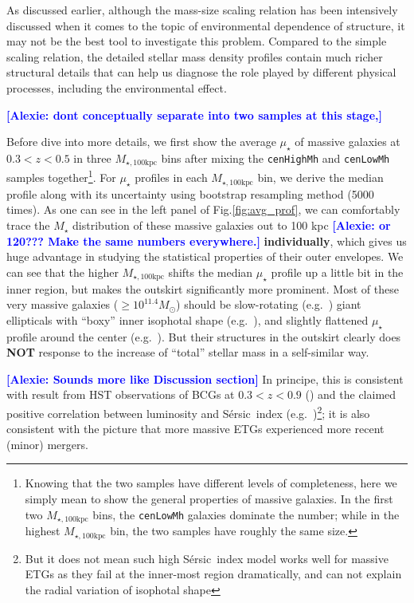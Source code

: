 \documentclass{emulateapj}
\def\ser{{S\'{e}rsic\ }}
\def\rbcg{\texttt{cenHighMh}}
\def\nbcg{\texttt{cenLowMh}}
\def\mstar{{$M_{\star}$}}
\def\mtot{{$M_{\star,100\mathrm{kpc}}$}}
\def\mden{{$\mu_{\star}$}}
\newcommand{\alexie}[1]{\textcolor{blue}{\textbf{[Alexie: #1]}}}
\newcommand{\update}[1]{\textcolor{Bittersweet}{#1}}
\begin{document}
\begin{CJK*}{UTF8}{gbsn}
    As discussed earlier, although the mass-size scaling relation has been intensively 
    discussed when it comes to the topic of environmental dependence of structure, 
    it may not be the best tool to investigate this problem.    
    Compared to the simple scaling relation, the detailed stellar mass density profiles 
    contain much richer structural details that can help us diagnose the role played by 
    different physical processes, including the environmental effect.  
    
    \alexie{dont conceptually separate into two samples at this stage,}
    
    \update{
    Before dive into more details, we first show the average \mden{} of massive galaxies 
    at $0.3 < z < 0.5$ in three \mtot{} bins after mixing the \rbcg{} and \nbcg{} 
    samples together\footnote{Knowing that the two samples have different levels of 
    completeness, here we simply mean to show the general properties of massive galaxies.
    In the first two \mtot{} bins, the \nbcg{} galaxies dominate the number; while in
    the highest \mtot{} bin, the two samples have roughly the same size.}.   
    For \mden{} profiles in each \mtot{} bin, we derive the median profile along with its 
    uncertainty using bootstrap resampling method (5000 times). 
    As one can see in the left panel of Fig.\ref{fig:avg_prof}, we can comfortably trace 
    the \mstar{} distribution of these massive galaxies out to 100 kpc \alexie{or 120??? Make the same numbers everywhere.}
    \textbf{individually}, which gives us huge advantage in studying the statistical 
    properties of their outer envelopes. 
    We can see that the higher \mtot{} shifts the median \mden{} profile up a little bit 
    in the inner region, but makes the outskirt significantly more prominent. 
    Most of these very massive galaxies ($\ge 10^{11.4} M_{\odot}$) should be 
    slow-rotating (e.g.\ \citealt{Cappellari13b}) giant ellipticals with ``boxy'' inner 
    isophotal shape (e.g.\ \citealt{Kormendy2009}), and slightly flattened \mden{} profile 
    around the center (e.g.\ \citealt{Lauer07}).
    But their structures in the outskirt clearly does \textbf{NOT} response to the 
    increase of ``total'' stellar mass in a self-similar way.}
        
    \alexie{Sounds more like Discussion section} In principe, this is consistent with result from HST observations of BCGs at 
    $0.3 < z <0.9$ (\citealt{Bai2014}) and the claimed positive correlation between 
    luminosity and \ser index (e.g.\ \citealt{Savorgnan13})\footnote{But it does not mean 
    such high \ser index model works well for massive ETGs as they fail at the inner-most 
    region dramatically, and can not explain the radial variation of isophotal shape}; 
    it is also consistent with the picture that more massive ETGs experienced more recent 
    (minor) mergers.  
    

\end{CJK*}
\end{document}
